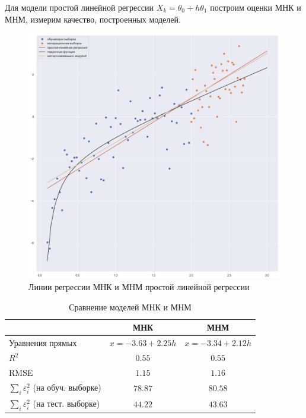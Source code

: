 \documentclass[a4paper,12pt]{article}
\begin{document}
Для модели простой линейной регрессии $X_k = \theta_0 + h\theta_1$ построим оценки МНК и МНМ, измерим качество, построенных моделей.

\begin{figure}[H]
    \includegraphics[width=\linewidth]{src/img/простая_линейная регрессия.png}
    \caption{Линии регрессии МНК и МНМ простой линейной регрессии}
\end{figure}

\begin{table}[H]
    \begin{center}
    \begin{tabular}{|l|c|c|}
        \hline
        & МНК & МНМ \\ \hline
        Уравнения прямых & $x = -3.63 + 2.25 h$ & $x = -3.34 + 2.12 h$ \\ \hline
        $R^2$ & $0.55$ & $0.55$ \\ \hline
        RMSE & $1.15$ & $1.16$ \\ \hline
        $\sum\limits_i \varepsilon_i^2$ (на обуч. выборке) & $78.87$ & $80.58$ \\ \hline
        $\sum\limits_i \varepsilon_i^2$ (на тест. выборке) & $44.22$ & $43.63$ \\ \hline
    \end{tabular}
    \caption{Сравнение моделей МНК и МНМ}
    \end{center}
\end{table}
\end{document}
